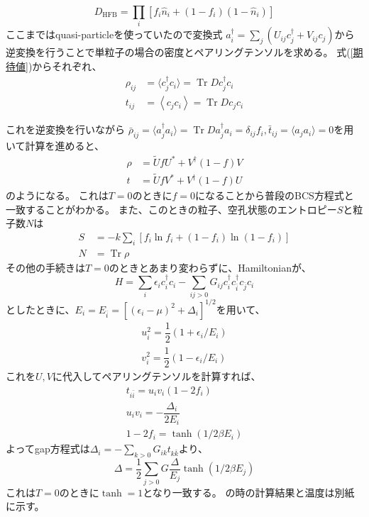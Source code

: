 \documentclass[a4paper,10pt]{jsarticle}
\begin{document}
  \begin{equation}
    D_{\text{HFB}}=\prod_i \left[f_i\hat{n}_i+(1 - f_i)(1 - \hat{n}_i)\right]
  \end{equation}
  ここまではquasi-particleを使っていたので変換式
  $a_i^{\dagger} = \sum_{j}(U_{ij}c_j^{\dagger}+V_{ij}c_j)$から
  逆変換を行うことで単粒子の場合の密度とペアリングテンソルを求める。
  式(\ref{期待値})からそれぞれ、
  \begin{align}
    \rho_{ij} &= \langle c_j^\dagger c_i\rangle=\operatorname{Tr}D c_j^\dagger c_i\\
    t_{ij}    &= \left\langle c_j c_i\right\rangle=\operatorname{Tr}D c_j c_i
  \end{align}

  これを逆変換を行いながら
  $\bar{\rho}_{ij}=\langle a_j^\dagger a_i\rangle=\operatorname{Tr}D a_j^\dagger a_i=\delta_{ij}f_i,
  \bar{t}_{ij}=\langle a_j a_i\rangle=0$を用いて計算を進めると、
  \begin{align}
    \rho &= \tilde{U}fU^{*} + V^{\dagger}(1-f)V \\
    t    &= \tilde{U}fV^{*} + V^{\dagger}(1-f)U
  \end{align}
  のようになる。
  これは$T=0$のときに$f=0$になることから普段のBCS方程式と一致することがわかる。
  また、このときの粒子、空孔状態のエントロピー$S$と粒子数$N$は
  \begin{align}
    S &= -k\sum_{i}\left[f_i\ln f_i + (1-f_i)\ln (1 - f_i)\right]\\
    N &= \operatorname{Tr}\rho
  \end{align}
  その他の手続きは$T=0$のときとあまり変わらずに、Hamiltonianが、
  \begin{equation}
    H=\sum_{i}\epsilon_ic_i^{\dagger}c_i-\sum_{ij>0}G_{ij}c_i^{\dagger}c_{\bar{i}}^{\dagger}c_{\bar{j}}c_i
  \end{equation}
  としたときに、$E_i=E_{\bar{i}}=[(\epsilon_i -\mu)^2 +\Delta_i]^{1/2}$を用いて、
  \begin{align}
    u_i^2 = \dfrac{1}{2}(1+\epsilon_i/E_i)\\
    v_i^2 = \dfrac{1}{2}(1-\epsilon_i/E_i)
  \end{align}
  これを$U,V$に代入してペアリングテンソルを計算すれば、
  \begin{align}
    t_{i\bar{i}}=u_iv_i(1-2f_i)\\
    u_iv_i=-\dfrac{\Delta_i}{2E_i}\\
    1-2f_i=\tanh(1/2\beta E_i)
  \end{align}
  よってgap方程式は$\Delta_i=-\sum_{k>0}G_{ik}t_{k\bar{k}}$より、
  \begin{equation}
    \Delta = \dfrac{1}{2}\sum_{j>0}G\dfrac{\Delta}{E_j} \tanh{(1/2\beta E_j)}
  \end{equation}
  これは$T=0$のときに$\tanh = 1$となり一致する。
  の時の計算結果と温度は別紙に示す。
  
\end{document}
